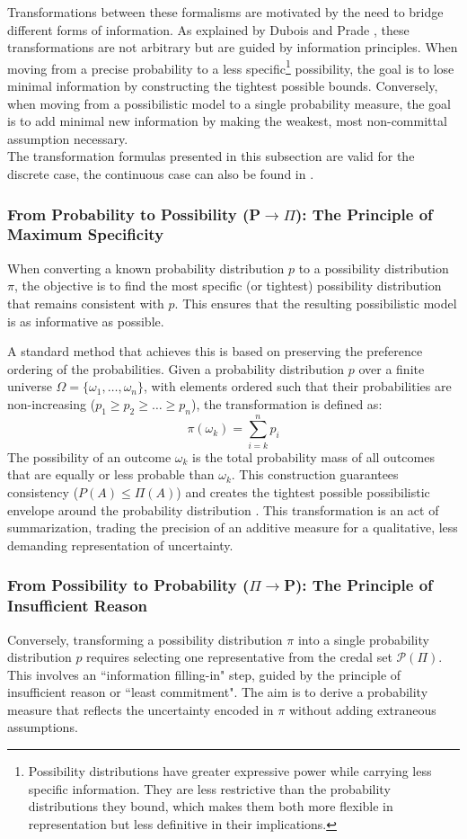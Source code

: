 Transformations between these formalisms are motivated by the need to bridge different forms of information. As explained by Dubois and Prade \cite{Dubois1997}, these transformations are not arbitrary but are guided by information principles. When moving from a precise probability to a less specific\footnote{Possibility distributions have greater expressive power while carrying less specific information. They are less restrictive than the probability distributions they bound, which makes them both more flexible in representation but less definitive in their implications.} possibility, the goal is to lose minimal information by constructing the tightest possible bounds. Conversely, when moving from a possibilistic model to a single probability measure, the goal is to add minimal new information by making the weakest, most non-committal assumption necessary.\\
The transformation formulas presented in this subsection are valid for the discrete case, the continuous case can also be found in \cite{Dubois1997}.

\subsubsection{From Probability to Possibility (P$\to\Pi$): The Principle of Maximum Specificity}
When converting a known probability distribution $p$ to a possibility distribution $\pi$, the objective is to find the most specific (or tightest) possibility distribution that remains consistent with $p$. This ensures that the resulting possibilistic model is as informative as possible.

A standard method that achieves this is based on preserving the preference ordering of the probabilities. Given a probability distribution $p$ over a finite universe $\Omega = \{\omega_1, \dots, \omega_n\}$, with elements ordered such that their probabilities are non-increasing ($p_1 \ge p_2 \ge \dots \ge p_n$), the transformation is defined as:
\[ \pi(\omega_k) = \sum_{i=k}^{n} p_i \]
The possibility of an outcome $\omega_k$ is the total probability mass of all outcomes that are equally or less probable than $\omega_k$. This construction guarantees consistency ($P(A) \le \Pi(A)$) and creates the tightest possible possibilistic envelope around the probability distribution \cite{Dubois1997}. This transformation is an act of summarization, trading the precision of an additive measure for a qualitative, less demanding representation of uncertainty.

\subsubsection{From Possibility to Probability ($\Pi\to$P): The Principle of Insufficient Reason}
Conversely, transforming a possibility distribution $\pi$ into a single probability distribution $p$ requires selecting one representative from the credal set $\mathcal{P}(\Pi)$. This involves an ``information filling-in" step, guided by the principle of insufficient reason or ``least commitment". The aim is to derive a probability measure that reflects the uncertainty encoded in $\pi$ without adding extraneous assumptions.

